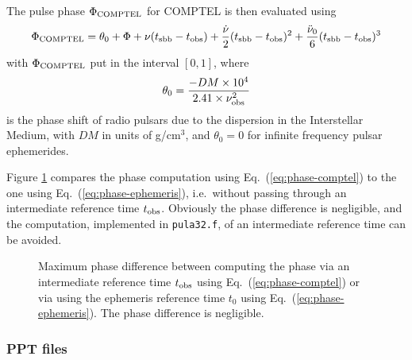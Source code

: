 \documentclass{article}[12pt,a4]
\begin{document}
The pulse phase $\Phi_{\rm COMPTEL}$ for COMPTEL is then evaluated using
\begin{equation}
\Phi_{\rm COMPTEL} = \theta_0 + \Phi + \nu (t_{\rm sbb} - t_{\rm obs}) + \frac{\dot{\nu}}{2} (t_{\rm sbb} - t_{\rm obs})^2 + \frac{\ddot{\nu}_0}{6} (t_{\rm sbb} - t_{\rm obs})^3
\label{eq:phase-comptel}
\end{equation}
with $\Phi_{\rm COMPTEL}$ put in the interval $[0,1]$, where 
\begin{equation}
\theta_0 = \frac{-DM \times 10^{4}}{2.41 \times \nu_{\rm obs}^2}
\end{equation}
is the phase shift of radio pulsars due to the dispersion in the Interstellar Medium, with $DM$ in units of g/cm$^3$,
and $\theta_0=0$ for infinite frequency pulsar ephemerides.

Figure \ref{fig:pulsar-phase} compares the phase computation using Eq.~(\ref{eq:phase-comptel}) to the one using
Eq.~(\ref{eq:phase-ephemeris}), i.e.~without passing through an intermediate reference time $t_{\rm obs}$.
Obviously the phase difference is negligible, and the computation, implemented in {\tt pula32.f}, of an intermediate
reference time can be avoided.

\begin{figure}[!t]
\center
{}
\caption{Maximum phase difference between computing the phase via an intermediate 
reference time $t_{\rm obs}$ using Eq.~(\ref{eq:phase-comptel}) or via using the ephemeris 
reference time $t_0$ using Eq.~(\ref{eq:phase-ephemeris}). The phase difference is negligible.}
\label{fig:pulsar-phase}
\end{figure}


\subsubsection{PPT files}
\end{document}
